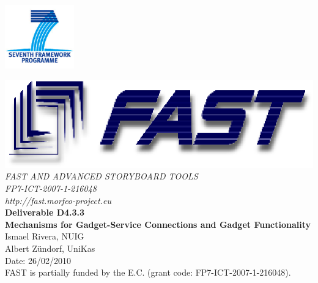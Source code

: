 \documentclass{article}
\newcommand\deliverableNumber{D4.3.3}
\newcommand\deliverableTitle{Mechanisms for Gadget-Service Connections and Gadget Functionality}
\newcommand\authorOne{Ismael Rivera, NUIG}
\newcommand\authorTwo{Albert Zündorf, UniKas}
\begin{document}

\def\note#1{\marginpar{\footnotesize#1}} %



\thispagestyle{empty}


\begin{flushright}
	\includegraphics[width=3cm]{images/FP7_logo}
\end{flushright}

\vspace{1cm}

	\begin{center}
		\includegraphics{images/FAST_logo}\\
		\vspace{1cm}
		{\LARGE{\sffamily \emph{FAST AND ADVANCED STORYBOARD TOOLS}}}\\
		\vspace{0.5cm}
		{\LARGE \sffamily \emph{FP7-ICT-2007-1-216048}}\\
		\vspace{0.5cm}
		{\LARGE \sffamily \emph{http://fast.morfeo-project.eu}}\\
		\vspace{4cm}
		{\LARGE \sffamily \textbf{Deliverable \deliverableNumber}}\\
		\vspace{0.5cm}
		{\LARGE \sffamily \textbf{\deliverableTitle}}\\
		\vspace{2cm}
		{\large \sffamily \authorOne}\\
		{\large \sffamily \authorTwo}\\
		\vspace{0.5cm}
		\vfill
		{\large \sffamily Date: 26/02/2010}\\
		\vspace{1cm}
		{\sffamily FAST is partially funded by the E.C. (grant code: FP7-ICT-2007-1-216048).}
		
	\end{center}
\end{document}
